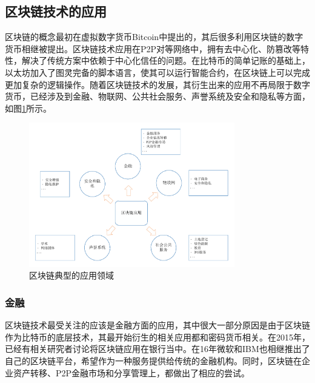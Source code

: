 \subsection{区块链技术的应用}

区块链的概念最初在虚拟数字货币Bitcoin中提出的\cite{nakamoto2008bitcoin}，其后很多利用区块链的数字货币相继被提出。区块链技术应用在P2P对等网络中，拥有去中心化、防篡改等特性，解决了传统方案中依赖于中心化信任的问题。在比特币的简单记账的基础上，以太坊\cite{buterin2013ethereum}加入了图灵完备的脚本语言，使其可以运行智能合约，在区块链上可以完成更加复杂的逻辑操作。随着区块链技术的发展，其衍生出来的应用不再局限于数字货币，已经涉及到金融、物联网、公共社会服务、声誉系统及安全和隐私等方面\cite{zheng2016blockchain}，如图\ref{fig:applications}所示。

\begin{figure}[htbp]
 	\centering
 	\includegraphics[width = 0.8\textwidth]{img/applications}
 	\caption{区块链典型的应用领域}\label{fig:applications}
\end{figure}


\subsubsection{金融}

区块链技术最受关注的应该是金融方面的应用，其中很大一部分原因是由于区块链作为比特币的底层技术，其最开始衍生的相关应用都和密码货币相关。在2015年，已经有相关研究者讨论将区块链应用在银行当中\cite{peters2015trends}。在16年微软和IBM也相继推出了自己的区块链平台，希望作为一种服务提供给传统的金融机构。同时，区块链在企业资产转移、P2P金融市场和分享管理上，都做出了相应的尝试。

